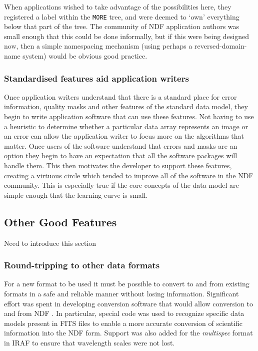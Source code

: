 \documentclass[final,authoryear,5p,times,twocolumn]{elsarticle}
\begin{document}
When applications wished to take advantage of the possibilities here,
they registered a label within the \texttt{MORE} tree, and were deemed
to `own' everything below that part of the tree.  The community of NDF
application authors was small enough that this could be done
informally, but if this were being designed now, then a simple
namespacing mechanism (using perhaps a reversed-domain-name system)
would be obvious good practice.

\subsubsection{Standardised features aid application writers}

Once application writers understand that there is a standard place for
error information, quality masks and other features of the standard
data model, they begin to write application software that can use
these features. Not having to use a heuristic to determine whether a
particular data array represents an image or an error can allow the
application writer to focus more on the algorithms that matter. Once
users of the software understand that errors and masks are an option
they begin to have an expectation that all the software packages will
handle them. This then motivates the developer to support these
features, creating a virtuous circle which tended to improve all of
the software in the NDF community.
This is especially true if the core concepts of the data
model are simple enough that the learning curve is small.

\subsection{Other Good Features}

{\color{red}Need to introduce this section}

\subsubsection{Round-tripping to other data formats}

For a new format to be used it must be possible to
convert to and from existing formats in a safe and reliable manner
without losing information.
Significant effort was spent in developing conversion software that
would allow conversion to and from NDF
\citep{SUN55,1997STARB..19...14C}. In particular, special code was
used to recognize specific data models present in FITS files to enable
a more accurate conversion of scientific information into the NDF
form. Support was also added for the \emph{multispec} format in IRAF
\citep{1993ASPC...52..467V} to ensure that wavelength scales were not
lost.
\end{document}
